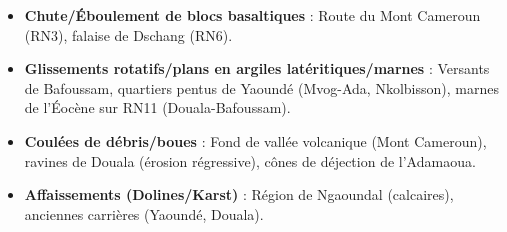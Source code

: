 \documentclass[11pt]{article}
\begin{document}
\begin{exemplebox}
    \begin{itemize}
        \item \textbf{Chute/Éboulement de blocs basaltiques} : Route du Mont Cameroun (RN3), falaise de Dschang (RN6).
        \item \textbf{Glissements rotatifs/plans en argiles latéritiques/marnes} : Versants de Bafoussam, quartiers pentus de Yaoundé (Mvog-Ada, Nkolbisson), marnes de l'Éocène sur RN11 (Douala-Bafoussam).
        \item \textbf{Coulées de débris/boues} : Fond de vallée volcanique (Mont Cameroun), ravines de Douala (érosion régressive), cônes de déjection de l'Adamaoua.
        \item \textbf{Affaissements (Dolines/Karst)} : Région de Ngaoundal (calcaires), anciennes carrières (Yaoundé, Douala).
    \end{itemize}
\end{exemplebox}
\end{document}
